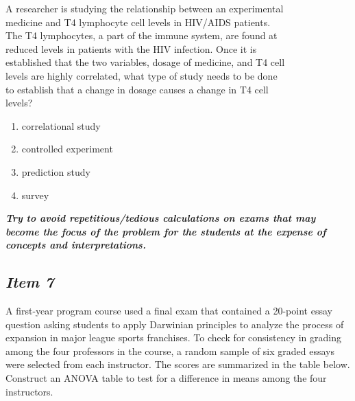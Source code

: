 \documentclass[twoside,openany]{tufte-book}
\begin{document}
A researcher is studying the relationship between an experimental \\ medicine and T4 lymphocyte cell levels in HIV/AIDS patients. \\ The T4 lymphocytes, a part of the immune system, are found at \\ reduced levels in patients with the HIV infection. Once it is \\ established that the two variables, dosage of medicine, and T4 cell \\ levels are highly correlated, what type of study needs to be done \\ to establish that a change in dosage causes a change in T4 cell \\levels? 
\begin{enumerate} [leftmargin=2cm, itemsep=.2em]
\item correlational study
\item controlled experiment
\item prediction study
\item survey
\end{enumerate}

\noindent\textbf{\textit{Try to avoid repetitious/tedious calculations on exams that may become the focus of the problem for the students at the expense of concepts and interpretations.}}

\subsection{\textbf{\textit{Item 7}}}

A first-year program course  used a final exam that contained a 20-point essay question asking students to apply Darwinian principles to analyze the process of expansion in major league sports franchises.  To check for consistency in grading among the four professors in the course, a random sample of six graded essays were selected from each instructor.  The scores are summarized in the table below.  Construct an ANOVA table to test for a difference in means among the four instructors. 
\end{document}
